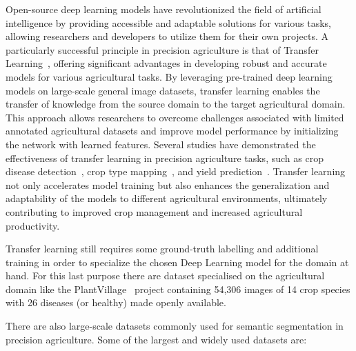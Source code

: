 \documentclass[runningheads]{llncs}
\begin{document}
Open-source deep learning models have revolutionized the field of artificial intelligence by providing accessible and adaptable solutions for various tasks, allowing researchers and developers to utilize them for their own projects. A particularly successful principle in precision agriculture is that of Transfer Learning~\cite{zhuang2020comprehensive}, offering significant advantages in developing robust and accurate models for various agricultural tasks. By leveraging pre-trained deep learning models on large-scale general image datasets, transfer learning enables the transfer of knowledge from the source domain to the target agricultural domain. This approach allows researchers to overcome challenges associated with limited annotated agricultural datasets and improve model performance by initializing the network with learned features. Several studies have demonstrated the effectiveness of transfer learning in precision agriculture tasks, such as crop disease detection~\cite{paymode_transfer_2022}, crop type mapping~\cite{nowakowski_crop_2021}, and yield prediction~\cite{10.1145/3209811.3212707}. Transfer learning not only accelerates model training but also enhances the generalization and adaptability of the models to different agricultural environments, ultimately contributing to improved crop management and increased agricultural productivity.
 
Transfer learning still requires some ground-truth labelling and additional training in order to specialize the chosen Deep Learning model for the domain at hand. For this last purpose there are dataset specialised on the agricultural domain like the PlantVillage~\cite{mohanty2016plantvillage} project containing 54,306 images of 14 crop species with 26 diseases (or healthy) made openly available.

There are also large-scale datasets commonly used for semantic segmentation in precision agriculture. Some of the largest and widely used datasets are:
\end{document}
